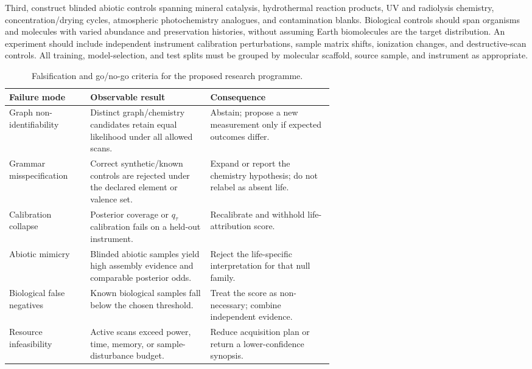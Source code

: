 \documentclass[10pt,a4paper]{article}
\begin{document}
Third, construct blinded abiotic controls spanning mineral catalysis, hydrothermal reaction products, UV and radiolysis chemistry, concentration/drying cycles, atmospheric photochemistry analogues, and contamination blanks. Biological controls should span organisms and molecules with varied abundance and preservation histories, without assuming Earth biomolecules are the target distribution. An experiment should include independent instrument calibration perturbations, sample matrix shifts, ionization changes, and destructive-scan controls. All training, model-selection, and test splits must be grouped by molecular scaffold, source sample, and instrument as appropriate.

\begin{table}[H]
\centering\small
\caption{Falsification and go/no-go criteria for the proposed research programme.}
\label{tab:falsify}
\begin{tabularx}{\linewidth}{p{0.25\linewidth}p{0.37\linewidth}X}
\toprule
Failure mode & Observable result & Consequence \\
\midrule
Graph non-identifiability & Distinct graph/chemistry candidates retain equal likelihood under all allowed scans. & Abstain; propose a new measurement only if expected outcomes differ. \\
Grammar misspecification & Correct synthetic/known controls are rejected under the declared element or valence set. & Expand or report the chemistry hypothesis; do not relabel as absent life. \\
Calibration collapse & Posterior coverage or $q_\tau$ calibration fails on a held-out instrument. & Recalibrate and withhold life-attribution score. \\
Abiotic mimicry & Blinded abiotic samples yield high assembly evidence and comparable posterior odds. & Reject the life-specific interpretation for that null family. \\
Biological false negatives & Known biological samples fall below the chosen threshold. & Treat the score as non-necessary; combine independent evidence. \\
Resource infeasibility & Active scans exceed power, time, memory, or sample-disturbance budget. & Reduce acquisition plan or return a lower-confidence synopsis. \\
\bottomrule
\end{tabularx}
\end{table}
\end{document}
